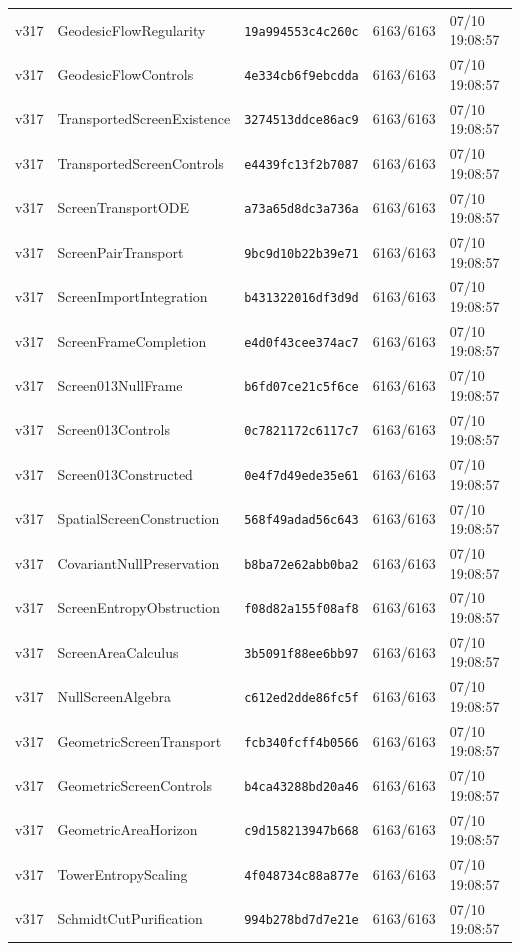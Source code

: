 \documentclass[11pt]{article}
\theoremstyle{definition}\newtheorem{deriv}{Derivação}
\begin{document}
{\begin{longtable}{@{}lllll@{}}
v317 & GeodesicFlowRegularity & \texttt{19a994553c4c260c} & 6163/6163 & 07/10 19:08:57 \\
v317 & GeodesicFlowControls & \texttt{4e334cb6f9ebcdda} & 6163/6163 & 07/10 19:08:57 \\
v317 & TransportedScreenExistence & \texttt{3274513ddce86ac9} & 6163/6163 & 07/10 19:08:57 \\
v317 & TransportedScreenControls & \texttt{e4439fc13f2b7087} & 6163/6163 & 07/10 19:08:57 \\
v317 & ScreenTransportODE & \texttt{a73a65d8dc3a736a} & 6163/6163 & 07/10 19:08:57 \\
v317 & ScreenPairTransport & \texttt{9bc9d10b22b39e71} & 6163/6163 & 07/10 19:08:57 \\
v317 & ScreenImportIntegration & \texttt{b431322016df3d9d} & 6163/6163 & 07/10 19:08:57 \\
v317 & ScreenFrameCompletion & \texttt{e4d0f43cee374ac7} & 6163/6163 & 07/10 19:08:57 \\
v317 & Screen013NullFrame & \texttt{b6fd07ce21c5f6ce} & 6163/6163 & 07/10 19:08:57 \\
v317 & Screen013Controls & \texttt{0c7821172c6117c7} & 6163/6163 & 07/10 19:08:57 \\
v317 & Screen013Constructed & \texttt{0e4f7d49ede35e61} & 6163/6163 & 07/10 19:08:57 \\
v317 & SpatialScreenConstruction & \texttt{568f49adad56c643} & 6163/6163 & 07/10 19:08:57 \\
v317 & CovariantNullPreservation & \texttt{b8ba72e62abb0ba2} & 6163/6163 & 07/10 19:08:57 \\
v317 & ScreenEntropyObstruction & \texttt{f08d82a155f08af8} & 6163/6163 & 07/10 19:08:57 \\
v317 & ScreenAreaCalculus & \texttt{3b5091f88ee6bb97} & 6163/6163 & 07/10 19:08:57 \\
v317 & NullScreenAlgebra & \texttt{c612ed2dde86fc5f} & 6163/6163 & 07/10 19:08:57 \\
v317 & GeometricScreenTransport & \texttt{fcb340fcff4b0566} & 6163/6163 & 07/10 19:08:57 \\
v317 & GeometricScreenControls & \texttt{b4ca43288bd20a46} & 6163/6163 & 07/10 19:08:57 \\
v317 & GeometricAreaHorizon & \texttt{c9d158213947b668} & 6163/6163 & 07/10 19:08:57 \\
v317 & TowerEntropyScaling & \texttt{4f048734c88a877e} & 6163/6163 & 07/10 19:08:57 \\
v317 & SchmidtCutPurification & \texttt{994b278bd7d7e21e} & 6163/6163 & 07/10 19:08:57 \\

\end{longtable}}
\end{document}
